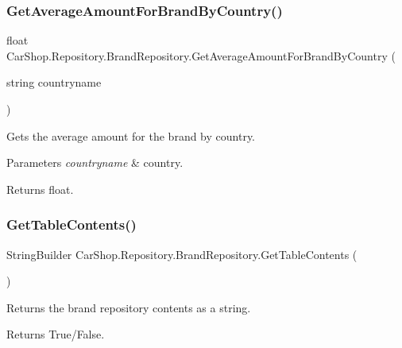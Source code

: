 \subsubsection{\texorpdfstring{Get\+Average\+Amount\+For\+Brand\+By\+Country()}{GetAverageAmountForBrandByCountry()}}
{\footnotesize\ttfamily float Car\+Shop.\+Repository.\+Brand\+Repository.\+Get\+Average\+Amount\+For\+Brand\+By\+Country (\begin{DoxyParamCaption}\item[{string}]{countryname }\end{DoxyParamCaption})}



Gets the average amount for the brand by country. 


\begin{DoxyParams}{Parameters}
{\em countryname} & country.\\
\hline
\end{DoxyParams}
\begin{DoxyReturn}{Returns}
float.
\end{DoxyReturn}
\mbox{\label{class_car_shop_1_1_repository_1_1_brand_repository_a7b59be4a7c33c0e49ed4fa7a94c17e50}} 
\subsubsection{\texorpdfstring{Get\+Table\+Contents()}{GetTableContents()}}
{\footnotesize\ttfamily String\+Builder Car\+Shop.\+Repository.\+Brand\+Repository.\+Get\+Table\+Contents (\begin{DoxyParamCaption}{ }\end{DoxyParamCaption})}



Returns the brand repository contents as a string. 

\begin{DoxyReturn}{Returns}
True/\+False.
\end{DoxyReturn}
\mbox{\label{class_car_shop_1_1_repository_1_1_brand_repository_a100a758892ec499a3497cf1959b0c368}} 
